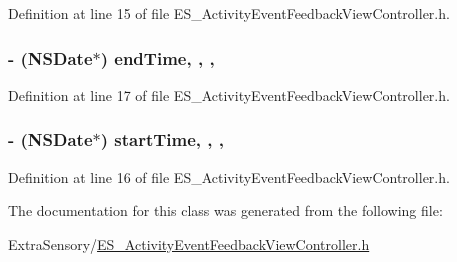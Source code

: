 Definition at line 15 of file E\+S\+\_\+\+Activity\+Event\+Feedback\+View\+Controller.\+h.

\hypertarget{interface_e_s___activity_event_feedback_view_controller_ac3657a5fd7911500e10f1857565c0ed5}{
\subsubsection[{end\+Time}]{\setlength{\rightskip}{0pt plus 5cm}-\/ (N\+S\+Date$\ast$) end\+Time\hspace{0.3cm}{\ttfamily [read]}, {\ttfamily [write]}, {\ttfamily [nonatomic]}, {\ttfamily [assign]}}}\label{interface_e_s___activity_event_feedback_view_controller_ac3657a5fd7911500e10f1857565c0ed5}


Definition at line 17 of file E\+S\+\_\+\+Activity\+Event\+Feedback\+View\+Controller.\+h.

\hypertarget{interface_e_s___activity_event_feedback_view_controller_a2b29282830a592c87190d3148fd34715}{
\subsubsection[{start\+Time}]{\setlength{\rightskip}{0pt plus 5cm}-\/ (N\+S\+Date$\ast$) start\+Time\hspace{0.3cm}{\ttfamily [read]}, {\ttfamily [write]}, {\ttfamily [nonatomic]}, {\ttfamily [assign]}}}\label{interface_e_s___activity_event_feedback_view_controller_a2b29282830a592c87190d3148fd34715}


Definition at line 16 of file E\+S\+\_\+\+Activity\+Event\+Feedback\+View\+Controller.\+h.



The documentation for this class was generated from the following file\+:\begin{DoxyCompactItemize}
\item 
Extra\+Sensory/\hyperlink{_e_s___activity_event_feedback_view_controller_8h}{E\+S\+\_\+\+Activity\+Event\+Feedback\+View\+Controller.\+h}\end{DoxyCompactItemize}
